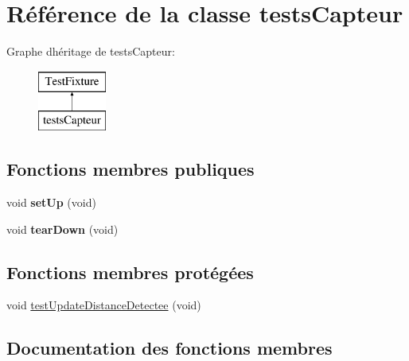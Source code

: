 \hypertarget{classtests_capteur}{}\section{Référence de la classe tests\+Capteur}
\label{classtests_capteur}
Graphe d\textquotesingle{}héritage de tests\+Capteur\+:\begin{figure}[H]
\begin{center}
\leavevmode
\includegraphics[height=2.000000cm]{classtests_capteur}
\end{center}
\end{figure}
\subsection*{Fonctions membres publiques}
\begin{DoxyCompactItemize}
\item 
\mbox{\label{classtests_capteur_a6a2a2c663436fef1169276aa1fc9eb0c}} 
void {\bfseries set\+Up} (void)
\item 
\mbox{\label{classtests_capteur_a009361891b05a8b2b8df71c28e593fe2}} 
void {\bfseries tear\+Down} (void)
\end{DoxyCompactItemize}
\subsection*{Fonctions membres protégées}
\begin{DoxyCompactItemize}
\item 
void \mbox{\hyperlink{classtests_capteur_a7a72c1351f675987bbd5cbe70c91f33b}{test\+Update\+Distance\+Detectee}} (void)
\end{DoxyCompactItemize}


\subsection{Documentation des fonctions membres}
\mbox{\label{classtests_capteur_a7a72c1351f675987bbd5cbe70c91f33b}} 
